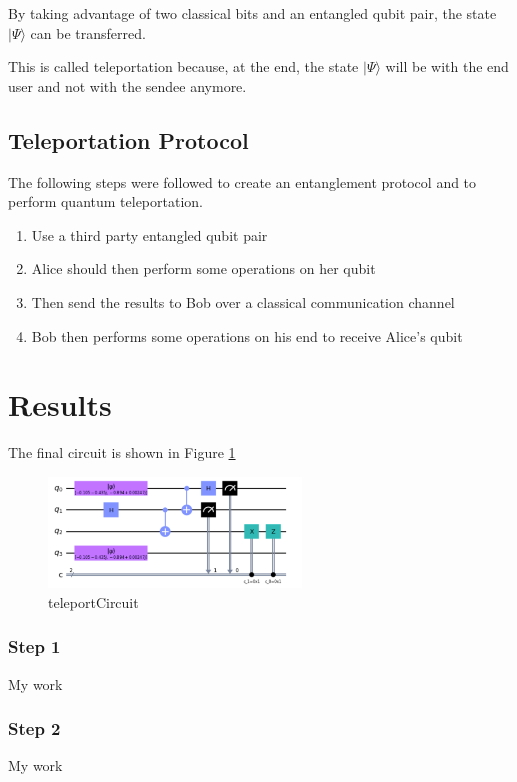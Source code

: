 By taking advantage of two classical bits and an entangled qubit pair, the state $|\Psi \rangle$ can be transferred.

This is called teleportation because, at the end, the state $|\Psi \rangle$ will be with the end user and not with the sendee anymore.

\subsection{Teleportation Protocol}
The following steps were followed to create an entanglement protocol and to perform quantum teleportation.

\begin{enumerate}
    \item Use a third party entangled qubit pair
    \item Alice should then perform some operations on her qubit
    \item Then send the results to Bob over a classical communication channel
    \item Bob then performs some operations on his end to receive Alice’s qubit
\end{enumerate}

\section{Results}

The final circuit is shown in Figure \ref{fig:teleportCircuit}
\begin{figure}[h]
    \centering
    \includegraphics[width=0.6\textwidth]{lab3/teleportCircuit.png}
    \caption{teleportCircuit}
    \label{fig:teleportCircuit}
\end{figure}

\subsubsection{Step 1}
My work

\subsubsection{Step 2}
My work

